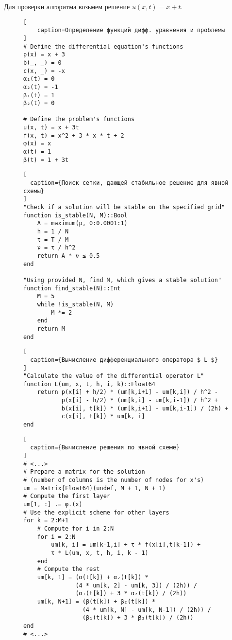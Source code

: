 Для проверки алгоритма возьмем решение $ u(x, t) = x + t $.

\captionsetup{singlelinecheck=false, justification=justified}

\begin{figure}[h!]
\begin{lstlisting}[
    caption=Определение функций дифф. уравнения и проблемы
]
# Define the differential equation's functions
p(x) = x + 3
b(_, _) = 0
c(x, _) = -x
α₁(t) = 0
α₂(t) = -1
β₁(t) = 1
β₂(t) = 0

# Define the problem's functions
u(x, t) = x + 3t
f(x, t) = x^2 + 3 * x * t + 2
φ(x) = x
α(t) = 1
β(t) = 1 + 3t
\end{lstlisting}
\end{figure}

\begin{figure}[h!]
\begin{lstlisting}[
  caption={Поиск сетки, дающей стабильное решение для явной схемы}
]
"Check if a solution will be stable on the specified grid"
function is_stable(N, M)::Bool
    A = maximum(p, 0:0.0001:1)
    h = 1 / N
    τ = T / M
    ν = τ / h^2
    return A * ν ≤ 0.5
end

"Using provided N, find M, which gives a stable solution"
function find_stable(N)::Int
    M = 5
    while !is_stable(N, M)
        M *= 2
    end
    return M
end
\end{lstlisting}
\end{figure}

\newpage

\begin{figure}[h!]
\begin{lstlisting}[
  caption={Вычисление дифференциального оператора $ L $}
]
"Calculate the value of the differential operator L"
function L(um, x, t, h, i, k)::Float64
    return p(x[i] + h/2) * (um[k,i+1] - um[k,i]) / h^2 -
           p(x[i] - h/2) * (um[k,i] - um[k,i-1]) / h^2 +
           b(x[i], t[k]) * (um[k,i+1] - um[k,i-1]) / (2h) +
           c(x[i], t[k]) * um[k, i]
end
\end{lstlisting}
\end{figure}

\begin{figure}[h!]
\begin{lstlisting}[
  caption={Вычисление решения по явной схеме}
]
# <...>
# Prepare a matrix for the solution
# (number of columns is the number of nodes for x's)
um = Matrix{Float64}(undef, M + 1, N + 1)
# Compute the first layer
um[1, :] .= φ.(x)
# Use the explicit scheme for other layers
for k = 2:M+1
    # Compute for i in 2:N
    for i = 2:N
        um[k, i] = um[k-1,i] + τ * f(x[i],t[k-1]) +
        τ * L(um, x, t, h, i, k - 1)
    end
    # Compute the rest
    um[k, 1] = (α(t[k]) + α₂(t[k]) *
               (4 * um[k, 2] - um[k, 3]) / (2h)) /
               (α₁(t[k]) + 3 * α₂(t[k]) / (2h))
    um[k, N+1] = (β(t[k]) + β₂(t[k]) *
                 (4 * um[k, N] - um[k, N-1]) / (2h)) /
                 (β₁(t[k]) + 3 * β₂(t[k]) / (2h))
end
# <...>
\end{lstlisting}
\end{figure}

